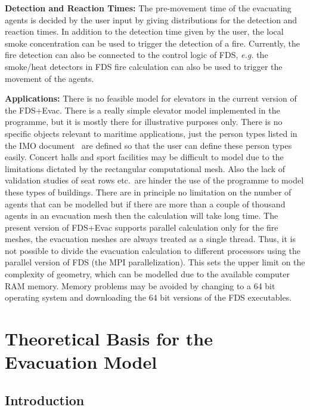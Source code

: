 \documentclass[12pt,a4paper,final,twoside]{stylevk}
\begin{document}
\textbf{Detection and Reaction Times:} The pre-movement time of the
evacuating agents is decided by the user input by giving distributions
for the detection and reaction times.  In addition to the detection
time given by the user, the local smoke concentration can be used to
trigger the detection of a fire.  Currently, the fire detection can
also be connected to the control logic of FDS, \emph{e.g.}  the
smoke/heat detectors in FDS fire calculation can also be used to
trigger the movement of the agents.


\textbf{Applications:} There is no feasible model for elevators in the
current version of the FDS+Evac.  There is a really simple elevator
model implemented in the programme, but it is mostly there for
illustrative purposes only.  There is no specific objects relevant to
maritime applications, just the person types listed in the IMO
document~\cite{IMO07} are defined so that the user can define these
person types easily.  Concert halls and sport facilities may be
difficult to model due to the limitations dictated by the rectangular
computational mesh.  Also the lack of validation studies of seat rows
etc.\ are hinder the use of the programme to model these types of
buildings.  There are in principle no limitation on the number of
agents that can be modelled but if there are more than a couple of
thousand agents in an evacuation mesh then the calculation will take
long time.  The present version of FDS+Evac supports parallel
calculation only for the fire meshes, the evacuation meshes are always
treated as a single thread.  Thus, it is not possible to divide the
evacuation calculation to different processors using the parallel
version of FDS (the MPI parallelization).  This sets the upper limit
on the complexity of geometry, which can be modelled due to the
available computer RAM memory.  Memory problems may be avoided by
changing to a 64 bit operating system and downloading the 64 bit
versions of the FDS executables.

\clearpage

\newpage


\chapter{Theoretical Basis for the Evacuation
  Model}\label{Sec_BasisModel} 


\section{Introduction}
\end{document}
